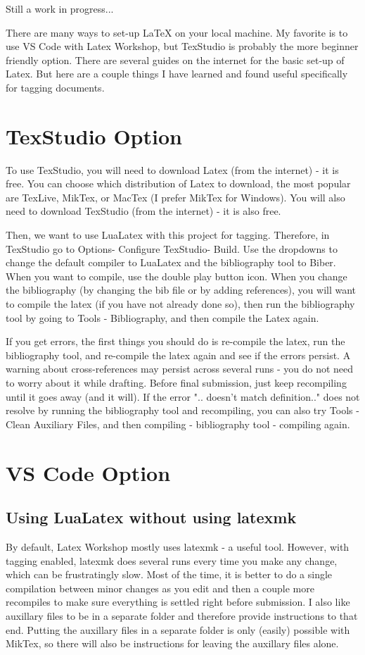 \documentclass{article}
\begin{document}
Still a work in progress...

There are many ways to set-up LaTeX on your local machine.
My favorite is to use VS Code with Latex Workshop, but TexStudio is probably the more beginner friendly option.
There are several guides on the internet for the basic set-up of Latex.
But here are a couple things I have learned and found useful specifically for tagging documents.

\section{TexStudio Option}
To use TexStudio, you will need to download Latex (from the internet) - it is free. You can choose which distribution of Latex to download, the most popular are TexLive, MikTex, or MacTex (I prefer MikTex for Windows).
You will also need to download TexStudio (from the internet) - it is also free.

Then, we want to use LuaLatex with this project for tagging. Therefore, in TexStudio go to Options- Configure TexStudio- Build. Use the dropdowns to change the default compiler to LuaLatex and the bibliography tool to Biber.
When you want to compile, use the double play button icon. When you change the bibliography (by changing the bib file or by adding references), you will want to compile the latex (if you have not already done so), then run the bibliography tool by going to Tools - Bibliography, and then compile the Latex again.

If you get errors, the first things you should do is re-compile the latex, run the bibliography tool, and re-compile the latex again and see if the errors persist.
A warning about cross-references may persist across several runs - you do not need to worry about it while drafting. Before final submission, just keep recompiling until it goes away (and it will).
If the error ".. doesn't match definition.." does not resolve by running the bibliography tool and recompiling, you can also try Tools - Clean Auxiliary Files, and then compiling - bibliography tool - compiling again.
\section{VS Code Option}
\subsection{Using LuaLatex without using latexmk}
By default, Latex Workshop mostly uses latexmk - a useful tool. However, with tagging enabled, latexmk does several runs every time you make any change, which can be frustratingly slow.
Most of the time, it is better to do a single compilation between minor changes as you edit and then a couple more recompiles to make sure everything is settled right before submission.
I also like auxillary files to be in a separate folder and therefore provide instructions to that end. Putting the auxillary files in a separate folder is only (easily) possible with MikTex, so there will also be instructions for leaving the auxillary files alone.
\end{document}
